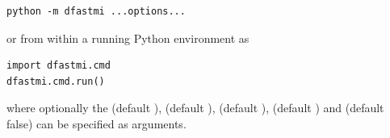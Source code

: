 \begin{Verbatim}
python -m dfastmi ...options...
\end{Verbatim}

or from within a running Python environment as

\begin{Verbatim}
import dfastmi.cmd
dfastmi.cmd.run()
\end{Verbatim}

where optionally the  (default ),  (default ),  (default ),  (default ) and  (default false) can be specified as arguments.
